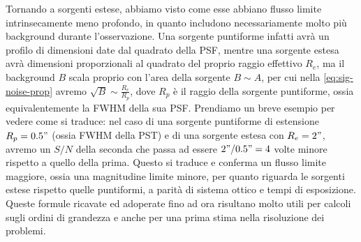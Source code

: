 Tornando a sorgenti estese, abbiamo visto come esse abbiano flusso limite intrinsecamente meno profondo, in quanto includono necessariamente molto più background durante l'osservazione. Una sorgente puntiforme infatti avrà un profilo di dimensioni date dal quadrato della PSF, mentre una sorgente estesa avrà dimensioni proporzionali al quadrato del proprio raggio effettivo $R_e$, ma il background $B$ scala proprio con l'area della sorgente $B\sim A$, per cui nella \ref{eq:sig-noise-prop} avremo $\sqrt{B}\sim \frac{R_e}{R_p}$, dove $R_p$ è il raggio della sorgente puntiforme, ossia equivalentemente la FWHM della sua PSF. Prendiamo un breve esempio per vedere come si traduce: nel caso di una sorgente puntiforme di estensione $R_p=0.5"$ (ossia FWHM della PST) e di una sorgente estesa con $R_e=2"$, avremo un $S/N$ della seconda che passa ad essere $2"/0.5"=4$ volte minore rispetto a quello della prima. Questo si traduce e conferma un flusso limite maggiore, ossia una magnitudine limite minore, per quanto riguarda le sorgenti estese rispetto quelle puntiformi, a parità di sistema ottico e tempi di esposizione. Queste formule ricavate ed adoperate fino ad ora risultano molto utili per calcoli sugli ordini di grandezza e anche per una prima stima nella risoluzione dei problemi.

